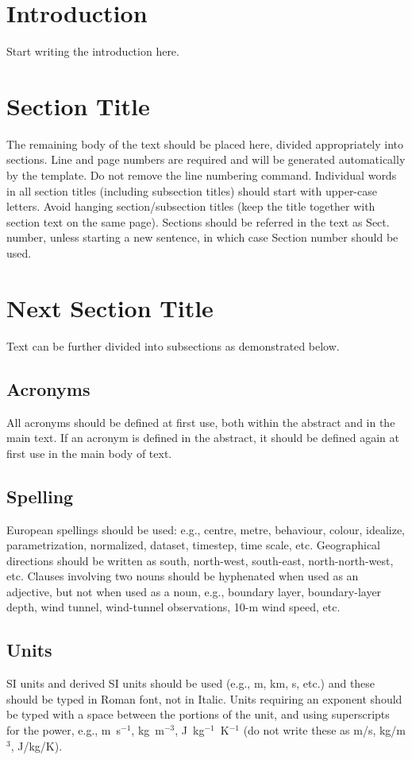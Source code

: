 \section{Introduction}
\label{intro}
Start writing the introduction here.

\section{Section Title}
\label{sec:1}
The remaining body of the text should be placed here, divided appropriately into sections. Line and page numbers are required and will be generated automatically by the template. Do not remove the line numbering command. Individual words in all section titles (including subsection titles) should start with upper-case letters. Avoid hanging section/subsection titles (keep the title together with section text on the same page). Sections should be referred in the text as Sect. number, unless starting a new sentence, in which case Section number should be used.

\section{Next Section Title}
Text can be further divided into subsections as demonstrated below.

\subsection{Acronyms}
All acronyms should be defined at first use, both within the abstract and in the main text. If an acronym is defined in the abstract, it should be defined again at first use in the main body of text.

\subsection{Spelling}
European spellings should be used: e.g., centre, metre, behaviour, colour, idealize, parametrization, normalized, dataset, timestep, time scale, etc. Geographical directions should be written as south, north-west, south-east, north-north-west, etc. Clauses involving two nouns should be hyphenated when used as an adjective, but not when used as a noun, e.g., boundary layer, boundary-layer depth, wind tunnel, wind-tunnel observations, 10-m wind speed, etc.

\subsection{Units}
SI units and derived SI units should be used (e.g., m, km, s, etc.) and these should be typed in Roman font, not in Italic. Units requiring an exponent should be typed with a space between the portions of the unit, and using superscripts for the power, e.g., m~s$^{-1}$, kg~m$^{-3}$, J~kg$^{-1}$~K$^{-1}$ (do not write these as m/s, kg/m$^3$, J/kg/K).

